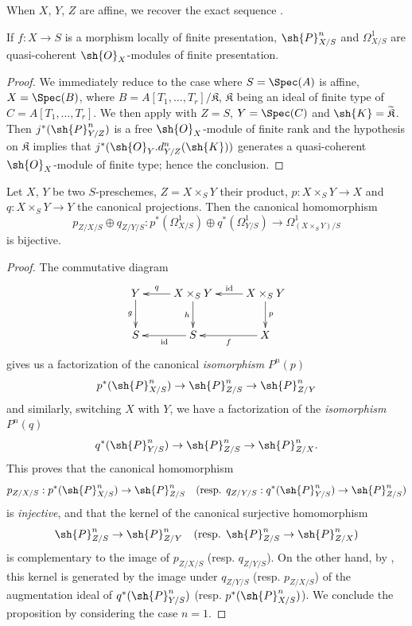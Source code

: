 When $X$, $Y$, $Z$ are affine, we recover the exact sequence .

\begin{corollary}[16.4.22]
\label{IV.16.4.22}
If $f: X \to S$ is a morphism locally of finite presentation, $\sh{P}_{X/S}^n$ and $\Omega_{X/S}^1$ are quasi-coherent $\sh{O}_X$-modules of finite presentation.
\end{corollary}

\begin{proof}
We immediately reduce to the case where $S = \Spec(A)$ is affine, $X = \Spec(B)$, where $B = A[T_1, \dots, T_r]/\mathfrak{K}$, $\mathfrak{K}$ being an ideal of finite type of $C = A[T_1, \dots, T_r]$.
We then apply  with $Z = S$, $Y = \Spec(C)$ and $\sh{K} = \widetilde{\mathfrak{K}}$.
Then $j^*(\sh{P}_{Y/Z}^n)$ is a free $\sh{O}_X$-module of finite rank  and the hypothesis on $\mathfrak{K}$ implies that $j^*(\sh{O}_Y.d_{Y/Z}^n(\sh{K}))$ generates a quasi-coherent $\sh{O}_X$-module of finite type;
hence the conclusion.
\end{proof}

\begin{proposition}[16.4.23]
\label{IV.16.4.23}
Let $X$, $Y$ be two $S$-preschemes, $Z = X \times_S Y$ their product, $p:X \times_S Y \to X$ and $q:X \times_S Y \to Y$ the canonical projections.
Then the canonical homomorphism
\[
  \label{IV.16.4.23.1}
  p_{Z/X/S} \oplus q_{Z/Y/S}: p^*(\Omega_{X/S}^1) \oplus  q^*(\Omega_{Y/S}^1) \to \Omega_{(X\times_S Y)/S}^1
  \tag{16.4.23.1}
\]
is bijective.
\end{proposition}   

\begin{proof}
The commutative diagram
\[
  \xymatrix{
    Y \ar[d]_-g & X \times_S Y \ar[l]_-q \ar[d]_-h & X \times_S Y \ar[l]_-{\operatorname{id}} \ar[d]^-p\\
    S & S \ar[l]^-{\operatorname{id}} & X \ar[l]^-f
  }
\]
gives us a factorization of the canonical \emph{isomorphism} $P^n(p)$ 
\[
  p^*(\sh{P}_{X/S}^n) \to \sh{P}_{Z/S}^n \to \sh{P}_{Z/Y}^n
\]
and similarly, switching $X$ with $Y$, we have a factorization of the \emph{isomorphism} $P^n(q)$
\[
  q^*(\sh{P}_{Y/S}^n) \to \sh{P}_{Z/S}^n \to \sh{P}_{Z/X}^n.
\]
This proves that the canonical homomorphism 
\[
  p_{Z/X/S}:p^*(\sh{P}_{X/S}^n) \to \sh{P}_{Z/S}^n \quad \text{(resp. $q_{Z/Y/S}:q^*(\sh{P}_{Y/S}^n) \to \sh{P}_{Z/S}^n$)}
\] 
is \emph{injective}, and that the kernel of the canonical surjective homomorphism  
\[
  \sh{P}_{Z/S}^n \to \sh{P}_{Z/Y}^n \quad \text{(resp. $\sh{P}_{Z/S}^n \to \sh{P}_{Z/X}^n$)}
\] 
is complementary to the image of $p_{Z/X/S}$ (resp. $q_{Z/Y/S}$).
On the other hand, by , this kernel is generated by the image under $q_{Z/Y/S}$ (resp. $p_{Z/X/S}$) of the augmentation ideal of $q^*(\sh{P}_{Y/S}^n)$ (resp. $p^*(\sh{P}_{X/S}^n)$).
We conclude the proposition by considering the case $n = 1$.
\end{proof}

